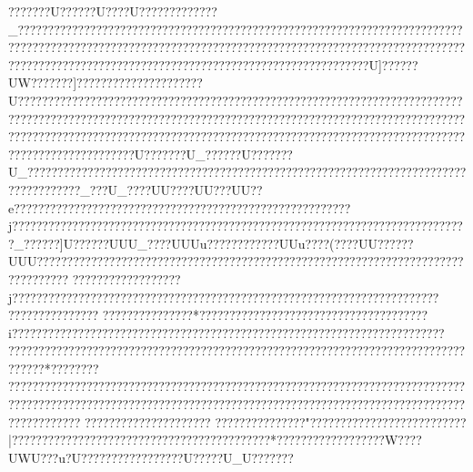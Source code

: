 {{{{{{{{{{{{{{{{{{{{{{{{{{{{{{{{{{{{{{{{{{{{{{{{{{{{{{{{{{{{{{{{{{{{{{{{{{{{{{{{{{{{{{{{{{{{{{{{{{{{{{{{{{{{{{{{{{{{{{{{{{{{{{{{{{{{{{{{{{{{{{{{{{{{{{{{{{{{{{{{{{{{{{{{{{{{{{{{{{{{{{{{{{{{{{{{{{{{{{{{{{{{{{{{{{{{{{{{{{{{{{{{{{{{{{{{{{{{{{{{{{{{{{{{{{{{{{{{{{{{{{{{{{{{{{{{{{{{{{{{{{{{{{{{{{{{{{{{{{{{{{{{{{{{{{{{{{{{{{{{{{{{{{{{{{{{{{{{{{{{{{{{{{{{{{{{{{{{{{{{{{{{{{{{{{{{{{{{{{{{{{{{{{{{{{{{{{{{{{{{{{{{{{{{{{{{{{{{{{{{{{{{{{{{{{{{{{{{{{{{{{{{{{{{{{{{{{{{{{{{{{{{{{{{{{{{{{{{{{{{{{{{{{{{{{{{{{{{{{{{{{{{{{{{{{{{{{{{{{{{{{{{{{{{{{{{{{{{{{{{{{{{{{{{{{{{{{{{{{{{{{{{{{{{{{{{{{{{{{{{{{{{{{{{{{{{{{{{{{{{{{{{{{{{{{{{{{{{{{{{{{{{{{{{{{{{{{{{{{{{{{{{{{{{{{{{{{{{{{{{{{{{{{{{{{{{{{{{{{{{{{{{{{{{{{{{{{{{{{{{{{{{{{{{{{{{{{{{{{{{{{{{{{{{{{{{{{{{{{{{{{{{{{{{{{{{{{{{{{{{{{{{{{{{{{{{{{{{{{{{{{{{{{{???????U{??????U????U?????????????_??????????????????????????????????????????????????????????????????????????????????????????????????????????????????????????????????????????????????????????????????????????????????????????????????????????????????U]??????UW???????]??????????{???????{????U??{???????????????????????????????????????????????????????????????????????{???????{???????{????????????????????????????????????????????????????????????????????????????????????????????????????????????????????????????????????????????????????????????????U???????U_??????U???????U_??????????????????????????? ??????????????????????????????????????????????????????????_???U_????UU????UU???UU??  
e??    ????  ???? ?? ????????????????????????????????????????????j????????????????????????????????????????????????????????????????????????????_??????]U??????UUU_????UUUu????    ????    ????UUu???? (  ????UU??????UUU?????????????????????????????????????????????????????????????????????????????????
??????????????????j??????????????????????????????????????  ????   ??????? ??????????????? ???????
??????????????? ???????????????*??????????????????????? ???????????????i?????????????????????????????????????????????????????????????????????????????????????????????????????????????????????????????????????????????????{?????????*????????
??????? ?????????????????????????????????????????????????????????????????????????????????????????????????????????????????? ??????? ??????? ??????????????? ??????? ??????? ?????????????????????
???????????????"??????? ???????????????????|???????????????????? ???????????????????????*??????????????????W????UWU???u?U?????????????????U?????U_U???   ????
}}}}}}}}}}}}}}}}}}}}}}}}}}}}}}}}}}}}}}}}}}}}}}}}}}}}}}}}}}}}}}}}}}}}}}}}}}}}}}}}}}}}}}}}}}}}}}}}}}}}}}}}}}}}}}}}}}}}}}}}}}}}}}}}}}}}}}}}}}}}}}}}}}}}}}}}}}}}}}}}}}}}}}}}}}}}}}}}}}}}}}}}}}}}}}}}}}}}}}}}}}}}}}}}}}}}}}}}}}}}}}}}}}}}}}}}}}}}}}}}}}}}}}}}}}}}}}}}}}}}}}}}}}}}}}}}}}}}}}}}}}}}}}}}}}}}}}}}}}}}}}}}}}}}}}}}}}}}}}}}}}}}}}}}}}}}}}}}}}}}}}}}}}}}}}}}}}}}}}}}}}}}}}}}}}}}}}}}}}}}}}}}}}}}}}}}}}}}}}}}}}}}}}}}}}}}}}}}}}}}}}}}}}}}}}}}}}}}}}}}}}}}}}}}}}}}}}}}}}}}}}}}}}}}}}}}}}}}}}}}}}}}}}}}}}}}}}}}}}}}}}}}}}}}}}}}}}}}}}}}}}}}}}}}}}}}}}}}}}}}}}}}}}}}}}}}}}}}}}}}}}}}}}}}}}}}}}}}}}}}}}}}}}}}}}}}}}}}}}}}}}}}}}}}}}}}}}}}}}}}}}}}}}}}}}}}}}}}}}}}}}}}}}}}}}}}}}}}}}}}}}}}}}}}}}}}}}}}}}}}}}}}}}}}}}}}}}}}}}}}}}}}}}}}}}}}}}}}}}}}}}}}}}}}}}}}}}}}}}}}}}}}}}}}}}}}}}}}}}}}}}}}}}}}}}}}}}}}}}}}}}}}}}}}}}}}}}}
